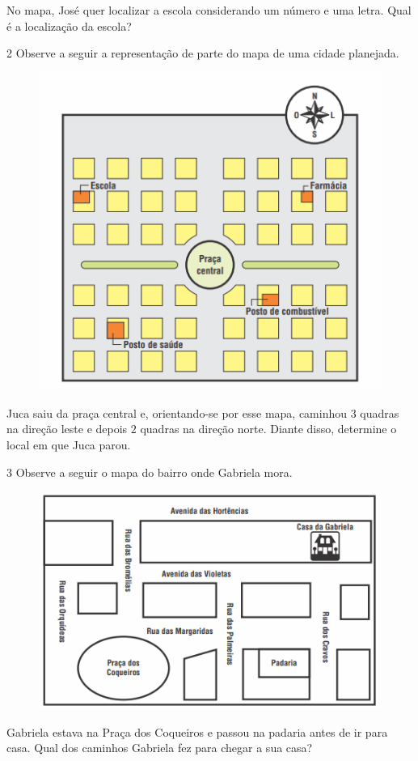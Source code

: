 No mapa, José quer localizar a escola considerando um número e uma letra.
Qual é a localização da escola?


\num{2}  Observe a seguir a representação de parte do mapa de uma cidade
planejada.\enlargethispage{\baselineskip}

\begin{figure}[H]
\centering\includegraphics[width=.45\textwidth]{./imgSAEB_6_MAT/media/image65.png}
\end{figure}

Juca saiu da praça central e, orientando-se por esse mapa, caminhou $3$
quadras na direção leste e depois $2$ quadras na direção norte. Diante disso,
determine o local em que Juca parou.


\num{3}  Observe a seguir o mapa do bairro onde Gabriela mora.

\begin{figure}[H]
\centering\includegraphics[width=.7\textwidth]{./imgSAEB_6_MAT/media/image66.png}
\end{figure}

Gabriela estava na Praça dos Coqueiros e passou na padaria antes de ir
para casa. Qual dos caminhos Gabriela fez para chegar a sua casa?


